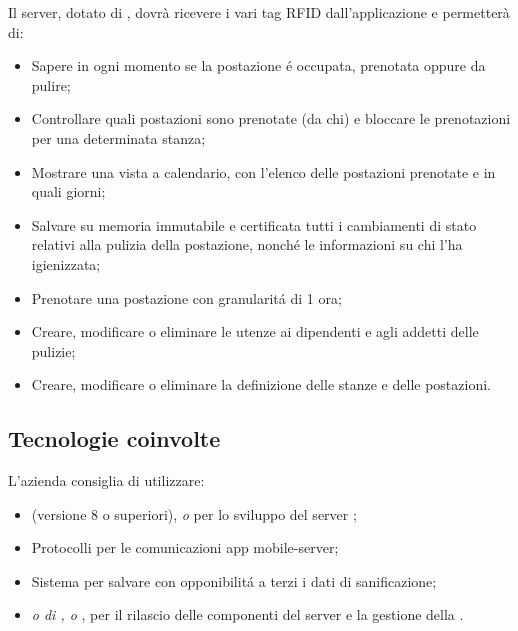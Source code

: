 Il server, dotato di , dovrà ricevere i vari tag RFID dall'applicazione e permetterà di:
\begin{itemize}
	\item Sapere in ogni momento se la postazione \'e occupata, prenotata oppure da pulire;
	\item Controllare quali postazioni sono prenotate (da chi) e bloccare le prenotazioni per una determinata stanza;
	\item Mostrare una vista a calendario, con l’elenco delle postazioni prenotate e in quali giorni;
	\item Salvare su memoria immutabile e certificata tutti i cambiamenti di stato relativi alla pulizia della postazione, nonch\'e le informazioni su chi l'ha igienizzata;
	\item Prenotare una postazione con granularit\'a di 1 ora;
	\item Creare, modificare o eliminare le utenze ai dipendenti e agli addetti delle pulizie;
	\item Creare, modificare o eliminare la definizione delle stanze e delle postazioni.
\end{itemize}

\subsection{Tecnologie coinvolte}
L'azienda consiglia di utilizzare:
\begin{itemize}
\item \textit{} (versione 8 o superiori), \textit{ o } per lo sviluppo del server ;
\item Protocolli  per le comunicazioni app mobile-server;
\item Sistema  per salvare con opponibilit\'a a terzi i dati di sanificazione;
\item \textit{ o di ,  o }, per il rilascio delle componenti del server e la gestione della .
\end{itemize}


